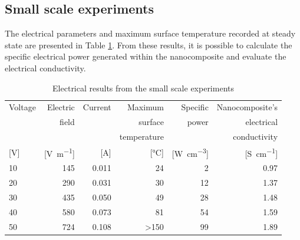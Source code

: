 \documentclass[11pt,review,times]{elsarticle}
\begin{document}
\subsection{Small scale experiments}

The electrical parameters and maximum surface temperature recorded at steady state are presented in Table \ref{tab:results_lab}. 
From these results, it is possible to calculate the specific electrical power generated within the nanocomposite and evaluate the electrical conductivity. 

\begin{table}[htb]
\centering
\begin{tabular}{@{}lrrrrr@{}}
\toprule
Voltage 				& Electric							& Current 				& Maximum  					& Specific   										& Nanocomposite's \\ 
 						& field								&  							& surface 					& power   											& electrical \\ 
 						& 										&  							& temperature 				&    													& conductivity \\
{[}\si{\volt}{]} 	& {[}\si{\volt\per\metre}{]} 	& {[}\si{\ampere}{]} 	& {[}\si{\celsius}{]} 	& {[}\si{\watt\per\cubic\centi\metre}{]}	& {[}\si{\siemens\per\centi\metre}{]} \\ \midrule
10 						& 145									& 0.011 					& 24 							& 2		  												& 0.97 \\
20						& 290									& 0.031 					& 30 							& 12	 												& 1.37 \\
30 						& 435									& 0.050 					& 49 							& 28	 												& 1.48 \\
40 						& 580									& 0.073 					& 81 							& 54	 												& 1.59 \\
50 						& 724									& 0.108 					& \textgreater 150 		& 99	 												& 1.89 \\ \bottomrule
\end{tabular}%
\caption{Electrical results from the small scale experiments}
\label{tab:results_lab}
\end{table}
\end{document}
